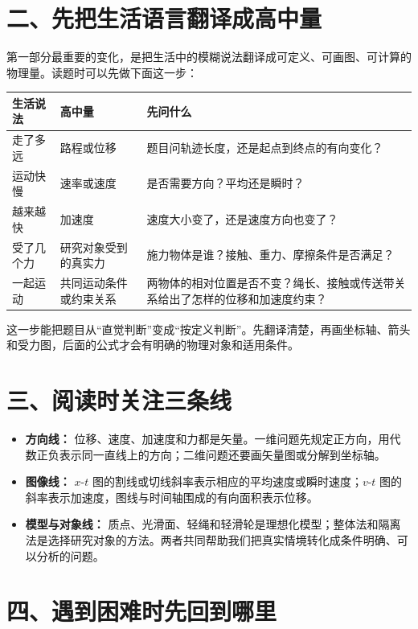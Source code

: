 \section*{二、先把生活语言翻译成高中量}

第一部分最重要的变化，是把生活中的模糊说法翻译成可定义、可画图、可计算的物理量。读题时可以先做下面这一步：

\begin{center}
\begin{tabular}{p{}p{}p{}}
\toprule
\textbf{生活说法} & \textbf{高中量} & \textbf{先问什么} \\
\midrule
走了多远 & 路程或位移 & 题目问轨迹长度，还是起点到终点的有向变化？ \\
运动快慢 & 速率或速度 & 是否需要方向？平均还是瞬时？ \\
越来越快 & 加速度 & 速度大小变了，还是速度方向也变了？ \\
受了几个力 & 研究对象受到的真实力 & 施力物体是谁？接触、重力、摩擦条件是否满足？ \\
一起运动 & 共同运动条件或约束关系 & 两物体的相对位置是否不变？绳长、接触或传送带关系给出了怎样的位移和加速度约束？ \\
\bottomrule
\end{tabular}
\end{center}

这一步能把题目从“直觉判断”变成“按定义判断”。先翻译清楚，再画坐标轴、箭头和受力图，后面的公式才会有明确的物理对象和适用条件。

\section*{三、阅读时关注三条线}

\begin{itemize}[itemsep=0.2em]
  \item \textbf{方向线：} 位移、速度、加速度和力都是矢量。一维问题先规定正方向，用代数正负表示同一直线上的方向；二维问题还要画矢量图或分解到坐标轴。
  \item \textbf{图像线：} $x$-$t$ 图的割线或切线斜率表示相应的平均速度或瞬时速度；$v$-$t$ 图的斜率表示加速度，图线与时间轴围成的有向面积表示位移。
  \item \textbf{模型与对象线：} 质点、光滑面、轻绳和轻滑轮是理想化模型；整体法和隔离法是选择研究对象的方法。两者共同帮助我们把真实情境转化成条件明确、可以分析的问题。
\end{itemize}

\section*{四、遇到困难时先回到哪里}

